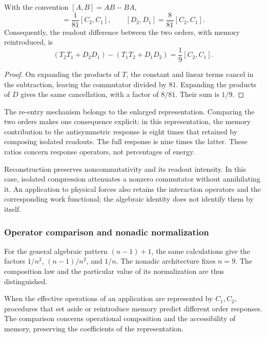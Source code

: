 \begin{proposition}
\label{md:restop:proposicion-orden}
With the convention $[A,B]=AB-BA$,
\begin{equation}
 [T_2,T_1]=\frac1{81}[C_2,C_1],\qquad
 [D_2,D_1]=\frac8{81}[C_2,C_1].
 \label{md:restop:reparto-conmutadores}
\end{equation}
Consequently, the readout difference between the two orders, with
memory reintroduced, is
\begin{equation}
 \boxed{(T_2T_1+D_2D_1)-(T_1T_2+D_1D_2)
 =\frac19[C_2,C_1].}
 \label{md:restop:orden-completo}
\end{equation}
\end{proposition}
\begin{proof}
On expanding the products of $T$, the constant and linear terms
cancel in the subtraction, leaving the commutator divided by $81$.
Expanding the products of $D$ gives the same cancellation, with a
factor of $8/81$. Their sum is $1/9$.
\end{proof}

The re-entry mechanism belongs to the enlarged representation.
Comparing the two orders makes one consequence explicit:
in this representation, the memory contribution to the antisymmetric
response is eight times that retained by composing isolated
readouts. The full response is nine times the latter. These
ratios concern response operators, not percentages
of energy.

Reconstruction preserves noncommutativity and its readout intensity.
In this case, isolated compression attenuates a nonzero commutator without
annihilating it. An application to physical forces also retains the interaction
operators and the corresponding work functional; the algebraic
identity does not identify them by itself.

\subsubsection{Operator comparison and nonadic normalization}
\label{md:restop:contraste}

For the general algebraic pattern $(n-1)+1$, the same calculations give the
factors $1/n^2$, $(n-1)/n^2$, and $1/n$. The nonadic architecture fixes
$n=9$. The composition law and the particular value of
its normalization are thus distinguished.

When the effective operations of an application are represented by
$C_1,C_2$, procedures that set aside or reintroduce memory
predict different order responses. The comparison concerns operational
composition and the accessibility of memory, preserving
the coefficients of the representation.

